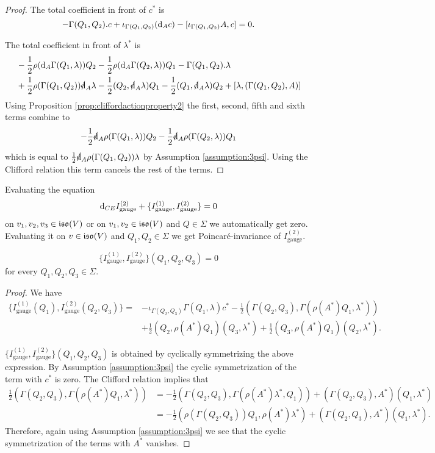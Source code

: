 \documentclass[10pt, oneside]{article}
\newcommand{\gauge}{\mathrm{gauge}}
\begin{document}
\begin{proof}
The total coefficient in front of $c^*$ is
\[-\Gamma(Q_1, Q_2).c + \iota_{\Gamma(Q_1, Q_2)}({\rm d}_A c) - [\iota_{\Gamma(Q_1, Q_2)} A, c] = 0.\]

The total coefficient in front of $\lambda^*$ is
\begin{align*}
&-\frac{1}{2}\rho(\d_A \Gamma(Q_1, \lambda))Q_2 -\frac{1}{2}\rho(\d_A \Gamma(Q_2, \lambda))Q_1 - \Gamma(Q_1, Q_2).\lambda \\
&+ \frac{1}{2}\rho(\Gamma(Q_1, Q_2))\sd{\d}_A\lambda - \frac{1}{2}(Q_2, \sd{\d}_A\lambda) Q_1 -\frac{1}{2}(Q_1, \sd{\d}_A\lambda) Q_2 + [\lambda, (\Gamma(Q_1, Q_2), A)]
\end{align*}
Using Proposition \ref{prop:cliffordactionproperty2} the first, second, fifth and sixth terms combine to
\[-\frac{1}{2} \sd{\d}_A\rho(\Gamma(Q_1, \lambda))Q_2 - \frac{1}{2} \sd{\d}_A\rho(\Gamma(Q_2, \lambda)) Q_1\]
which is equal to $\frac{1}{2} \sd{\d}_A \rho(\Gamma(Q_1, Q_2))\lambda$ by Assumption \ref{assumption:3psi}. Using the Clifford relation this term cancels the rest of the terms.
\end{proof}

Evaluating the equation
\[\d_{CE} I_{\gauge}^{(2)} + \{I_{\gauge}^{(1)}, I_{\gauge}^{(2)}\} = 0\]
on $v_1, v_2, v_3\in\mathfrak{iso}(V)$ or on $v_1, v_2\in\mathfrak{iso}(V)$ and $Q\in\Sigma$ we automatically get zero. Evaluating it on $v\in\mathfrak{iso}(V)$ and $Q_1, Q_2\in\Sigma$ we get Poincar\'{e}-invariance of $I_{\gauge}^{(2)}$.

\begin{lemma}
\[\{I_{\gauge}^{(1)}, I_{\gauge}^{(2)}\}(Q_1, Q_2, Q_3) = 0\]
for every $Q_1, Q_2, Q_3\in\Sigma$.
\label{lm:gaugemultiplet3}
\end{lemma}
\begin{proof}
We have
\begin{align*}
\{I_{\gauge}^{(1)}(Q_1), I_{\gauge}^{(2)}(Q_2, Q_3)\} = &-\iota_{\Gamma(Q_2, Q_3)}\Gamma(Q_1, \lambda) c^* - \frac{1}{2} (\Gamma(Q_2, Q_3), \Gamma(\rho(A^*) Q_1, \lambda^*)) \\
&+ \frac{1}{2}(Q_2, \rho(A^*)Q_1)(Q_3, \lambda^*) + \frac{1}{2}(Q_3, \rho(A^*) Q_1)(Q_2, \lambda^*).
\end{align*}

$\{I_{\gauge}^{(1)}, I_{\gauge}^{(2)}\}(Q_1, Q_2, Q_3)$ is obtained by cyclically symmetrizing the above expression. By Assumption \ref{assumption:3psi} the cyclic symmetrization of the term with $c^*$ is zero. The Clifford relation implies that
\begin{align*}
\frac{1}{2} (\Gamma(Q_2, Q_3), \Gamma(\rho(A^*) Q_1, \lambda^*)) &= -\frac{1}{2}(\Gamma(Q_2, Q_3), \Gamma(\rho(A^*)\lambda^*, Q_1)) + (\Gamma(Q_2, Q_3), A^*) (Q_1, \lambda^*) \\
&= -\frac{1}{2}(\rho(\Gamma(Q_2, Q_3)) Q_1, \rho(A^*)\lambda^*) + (\Gamma(Q_2, Q_3), A^*) (Q_1, \lambda^*).
\end{align*}
Therefore, again using Assumption \ref{assumption:3psi} we see that the cyclic symmetrization of the terms with $A^*$ vanishes.
\end{proof}
\end{document}

